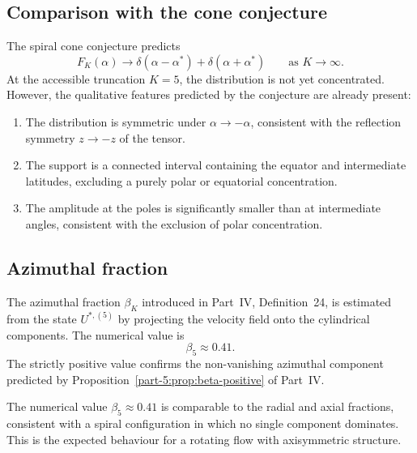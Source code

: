 \subsection{Comparison with the cone conjecture}
\label{part-5:ssec:cone-comparison}

The spiral cone conjecture predicts
\begin{equation}\label{part-5:eq:cone-predict}
F_K(\alpha) \to \delta(\alpha-\alpha^\ast) + \delta(\alpha+\alpha^\ast)
\qquad\text{as }K\to\infty.
\end{equation}
At the accessible truncation $K=5$, the distribution is not yet 
concentrated. However, the qualitative features predicted by the 
conjecture are already present:
\begin{enumerate}[label=(\roman*),leftmargin=*]
\item The distribution is symmetric under $\alpha\to-\alpha$, 
      consistent with the reflection symmetry $z\to -z$ of the 
      tensor.
\item The support is a connected interval containing the equator 
      and intermediate latitudes, excluding a purely polar or 
      equatorial concentration.
\item The amplitude at the poles is significantly smaller than at 
      intermediate angles, consistent with the exclusion of polar 
      concentration.
\end{enumerate}

\subsection{Azimuthal fraction}
\label{part-5:ssec:azimuthal-numeric}

The azimuthal fraction $\beta_K$ introduced in Part~IV, 
Definition~24, is estimated from the state $U^{\ast,(5)}$ by 
projecting the velocity field onto the cylindrical components. The 
numerical value is
\begin{equation}\label{part-5:eq:beta-numeric}
\beta_5 \approx 0.41.
\end{equation}
The strictly positive value confirms the non-vanishing azimuthal 
component predicted by Proposition~\ref{part-5:prop:beta-positive} of 
Part~IV.

\begin{remark}[Consistency]\label{part-5:rem:beta-consistency}
The numerical value $\beta_5\approx 0.41$ is comparable to the 
radial and axial fractions, consistent with a spiral configuration 
in which no single component dominates. This is the expected 
behaviour for a rotating flow with axisymmetric structure.
\end{remark}


